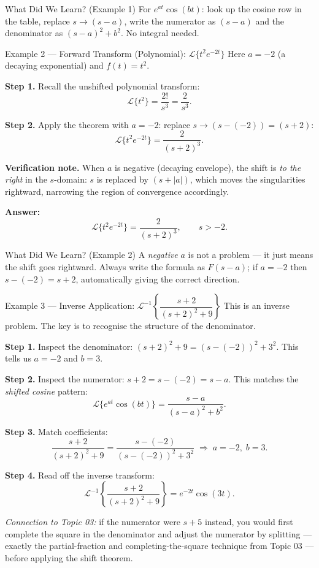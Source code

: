 \documentclass[12pt,a4paper]{article}
\begin{document}
\begin{learnbox}{What Did We Learn? (Example 1)}
For $e^{at}\cos(bt)$: look up the cosine row in the table, replace $s \to (s-a)$, write the
numerator as $(s-a)$ and the denominator as $(s-a)^2+b^2$.
No integral needed.
\end{learnbox}

\begin{infobox}{Example 2 --- Forward Transform (Polynomial): $\mathcal{L}\{t^2 e^{-2t}\}$}
Here $a = -2$ (a decaying exponential) and $f(t) = t^2$.

\textbf{Step 1.} Recall the unshifted polynomial transform:
\[
  \mathcal{L}\{t^2\} = \frac{2!}{s^3} = \frac{2}{s^3}.
\]

\textbf{Step 2.} Apply the theorem with $a = -2$: replace $s \to (s-(-2)) = (s+2)$:
\[
  \mathcal{L}\{t^2 e^{-2t}\} = \frac{2}{(s+2)^3}.
\]

\textbf{Verification note.}
When $a$ is negative (decaying envelope), the shift is \emph{to the right} in the $s$-domain:
$s$ is replaced by $(s+|a|)$, which moves the singularities rightward, narrowing the
region of convergence accordingly.

\textbf{Answer:}
\[
  \mathcal{L}\{t^2 e^{-2t}\} = \frac{2}{(s+2)^3}, \qquad s > -2.
\]
\end{infobox}

\begin{learnbox}{What Did We Learn? (Example 2)}
A \emph{negative} $a$ is not a problem --- it just means the shift goes rightward.
Always write the formula as $F(s-a)$; if $a = -2$ then $s - (-2) = s + 2$, automatically
giving the correct direction.
\end{learnbox}

\begin{infobox}{Example 3 --- Inverse Application: $\mathcal{L}^{-1}\!\left\{\dfrac{s+2}{(s+2)^2+9}\right\}$}
This is an inverse problem.
The key is to recognise the structure of the denominator.

\textbf{Step 1.} Inspect the denominator: $(s+2)^2 + 9 = (s-(-2))^2 + 3^2$.
This tells us $a = -2$ and $b = 3$.

\textbf{Step 2.} Inspect the numerator: $s+2 = s - (-2) = s - a$.
This matches the \emph{shifted cosine} pattern:
\[
  \mathcal{L}\{e^{at}\cos(bt)\} = \frac{s-a}{(s-a)^2+b^2}.
\]

\textbf{Step 3.} Match coefficients:
\[
  \frac{s+2}{(s+2)^2+9} = \frac{s-(-2)}{(s-(-2))^2+3^2}
  \;\Longrightarrow\; a = -2,\; b = 3.
\]

\textbf{Step 4.} Read off the inverse transform:
\[
  \mathcal{L}^{-1}\!\left\{\frac{s+2}{(s+2)^2+9}\right\} = e^{-2t}\cos(3t).
\]

\textit{Connection to Topic 03:} if the numerator were $s+5$ instead, you would first complete
the square in the denominator and adjust the numerator by splitting --- exactly the partial-fraction
and completing-the-square technique from Topic 03 --- before applying the shift theorem.
\end{infobox}
\end{document}
